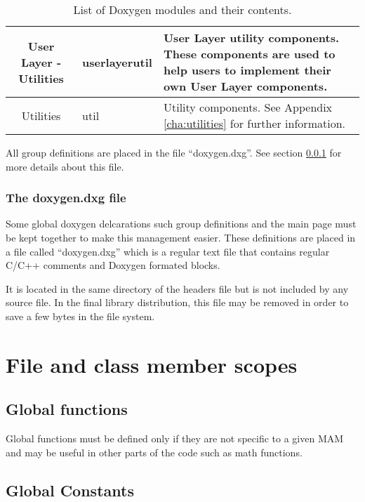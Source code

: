 \begin{table}[htb]
\begin{tabular}[t]{|c|l|l|}
		\hline
		User Layer - Utilities &
		userlayerutil &
		User Layer utility components. These components are used to help users to implement their own User Layer components. \\
		
		\hline
		Utilities &
		util &
		Utility components. See Appendix \ref{cha:utilities} for further information. \\
		
		\hline
	\end{tabular}
  \caption{List of Doxygen modules and their contents.}
	\label{tab:coding.doxygen.modules}
\end{table}

All group definitions are placed in the file ``doxygen.dxg''. See section \ref{sec:coding.doxygen.doxygen.dxg} for more details about this file.

\subsubsection{The doxygen.dxg file}
\label{sec:coding.doxygen.doxygen.dxg}

Some global doxygen delcarations such group definitions and the main page must be kept together to make this management easier. These definitions are placed in a file called ``doxygen.dxg'' which is a regular text file that contains regular C/C++ comments and Doxygen formated blocks.

It is located in the same directory of the headers file but is not included by any source file. In the final library distribution, this file may be removed in order to save a few bytes in the file system.

\section{File and class member scopes}
\label{sec:coding.c++}

\subsection{Global functions}

Global functions must be defined only if they are not specific to a given MAM and may be useful in other parts of the code such as math functions.

\subsection{Global Constants}

